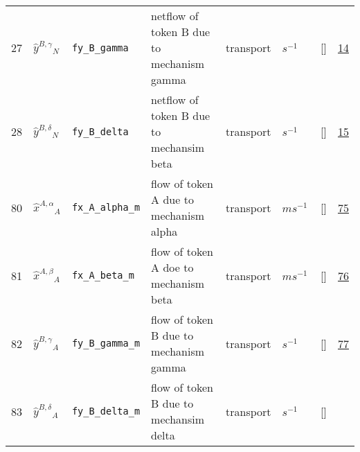 \begin{longtable}{|p{1cm}|p{3cm}|p{3cm}|p{7cm}|p{3.0cm}|p{3cm}|p{2cm}|p{1cm}|}
                 \\
    27
             & \hypertarget{"v:27"}{ $ {{\hat{y}^{B,\gamma}}}{_{N}} $}
             & \verb|fy_B_gamma|
             & netflow of token B due to mechanism gamma
             & \begin{lay}transport \end{lay}
             & $ s^{-1} \, $
             & []
             & \hyperlink{"e:14"}{ 14 }
                 \\
    28
             & \hypertarget{"v:28"}{ $ {{\hat{y}^{B,\delta}}}{_{N}} $}
             & \verb|fy_B_delta|
             & netflow of token B due to mechansim beta
             & \begin{lay}transport \end{lay}
             & $ s^{-1} \, $
             & []
             & \hyperlink{"e:15"}{ 15 }
                 \\
    80
             & \hypertarget{"v:80"}{ $ {{\hat{x}^{A,\alpha}}}{_{A}} $}
             & \verb|fx_A_alpha_m|
             & flow of token A due to mechanism alpha
             & \begin{lay}transport \end{lay}
             & $ m s^{-1} \, $
             & []
             & \hyperlink{"e:75"}{ 75 }
                 \\
    81
             & \hypertarget{"v:81"}{ $ {{\hat{x}^{A,\beta}}}{_{A}} $}
             & \verb|fx_A_beta_m|
             & flow of token A doe to mechanism beta
             & \begin{lay}transport \end{lay}
             & $ m s^{-1} \, $
             & []
             & \hyperlink{"e:76"}{ 76 }
                 \\
    82
             & \hypertarget{"v:82"}{ $ {{\hat{y}^{B,\gamma}}}{_{A}} $}
             & \verb|fy_B_gamma_m|
             & flow of token B due to mechanism gamma
             & \begin{lay}transport \end{lay}
             & $ s^{-1} \, $
             & []
             & \hyperlink{"e:77"}{ 77 }
                 \\
    83
             & \hypertarget{"v:83"}{ $ {{\hat{y}^{B,\delta}}}{_{A}} $}
             & \verb|fy_B_delta_m|
             & flow of token B due to mechansim delta
             & \begin{lay}transport \end{lay}
             & $ s^{-1} \, $
             & []

\end{longtable}
